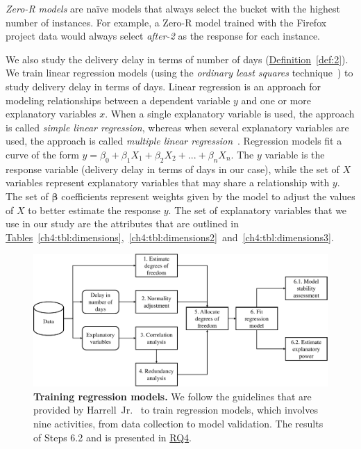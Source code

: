 \textit{Zero-R models} are na\"{i}ve models that always select the bucket with
the highest number of instances. For example, a Zero-R model trained with the
Firefox project data would always select \textit{after-2} as the response for
each instance. 

We also study the delivery delay in terms of number of days
(\hyperref[def:2]{Definition}~\ref{def:2}). We train linear regression models
(using the \textit{ordinary least squares} technique~\cite{springertexts}) to
study delivery delay in terms of days. Linear regression is an approach for
modeling relationships between a dependent variable $y$ and one or more
explanatory variables $x$. When a single explanatory variable is used, the
approach is called {\em simple linear regression}, whereas when several
explanatory variables are used, the approach is called {\em multiple linear
regression}~\cite{freedman2009statistical}.  Regression models fit a curve of
the form $y = \beta_0 + \beta_{1}X_1 + \beta_{2}X_2 + ... + \beta_{n}X_n$. The
$y$ variable is the response variable (\ie delivery delay in terms of days in
our case), while the set of ${X}$ variables represent explanatory variables that
may share a relationship with $y$. The set of $\boldsymbol{\beta}$ coefficients
represent weights given by the model to adjust the values of $X$ to better
estimate the response $y$. The set of explanatory variables that we use in our
study are the attributes that are outlined in
\hyperref[ch4:tbl:dimensions]{Tables}~\ref{ch4:tbl:dimensions},~\ref{ch4:tbl:dimensions2}~and~\ref{ch4:tbl:dimensions3}.  

\begin{figure}
	\centering
	\includegraphics[width=\textwidth,keepaspectratio]
	{chapters/chapter4/figures/linear_model_building_overview}
	\caption{\textbf{Training regression models.} We follow the guidelines
		that are
		provided by Harrell~Jr.~\cite{harrell2001regression} to train regression models, which
	involves nine activities, from data collection to model validation. The
results of Steps 6.2 and is presented in \hyperref[ch4:rq4]{RQ4}.}
	\label{ch4:fig:regression_process}
\end{figure}

